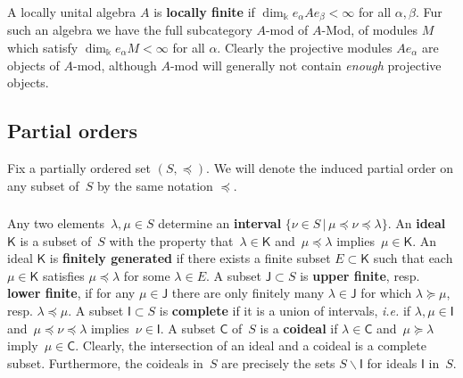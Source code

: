\documentclass[11pt]{amsart}
\newcommand{\CCC}{\mathsf{C}}
\newcommand{\III}{\mathsf{I}}
\newcommand{\JJJ}{\mathsf{J}}
\newcommand{\KKK}{\mathsf{K}}
\newcommand{\mk}{\Bbbk}
\numberwithin{equation}{section}
\theoremstyle{plain}
\theoremstyle{remark}
\theoremstyle{remark}
\theoremstyle{construction}
\begin{document}
\subsubsection{} A locally unital algebra $A$ is {\bf locally finite} if {$\dim_{\mk}e_\alpha Ae_\beta<\infty$ for all $\alpha,\beta$}. Fur such an algebra we have the full subcategory $A$-mod of $A$-Mod, of modules $M$ which satisfy $\dim_{\mk}e_\alpha M<\infty$ for all $\alpha$. Clearly the projective modules $Ae_\alpha$ are {objects of} $A$-mod, although $A$-mod will generally not contain {\em enough} projective objects.



\subsection{Partial orders} Fix a partially ordered set $(S,\preceq)$. We will denote the induced partial order on any subset of~$S$ by the same notation $\preceq$.


\subsubsection{}\label{secPaOr}
Any two elements~$\lambda,\mu\in S$ determine an {\bf interval} $\{\nu\in S\,|\,\mu\preceq\nu\preceq \lambda\}$.
 An {\bf ideal} $\KKK$ is a subset of~$S$ with the property that~$\lambda\in \KKK$ and~$\mu\preceq \lambda$ implies~$\mu\in\KKK$. An ideal $\KKK$ is {\bf finitely generated} if there exists a finite subset $E\subset \KKK$ such that each $\mu\in\KKK$ satisfies $\mu\preceq\lambda$ for some $\lambda\in E$. A subset $\JJJ { \subset S}$ is {\bf upper finite}, resp. {\bf lower finite}, if for any $\mu\in\JJJ$ there are only finitely many $\lambda\in \JJJ$ for which $\lambda\succeq\mu$, resp. $\lambda\preceq\mu$. A subset $\III{\subset S}$ is  {\bf complete} if it is a union of intervals, {\it i.e.} if $\lambda,\mu\in \III$ and~$\mu\preceq\nu\preceq \lambda$ implies~$\nu\in\III$. A subset $\CCC$ of~$S$ is a {\bf coideal} if $\lambda\in \CCC$ and~$\mu\succeq \lambda$ imply~$\mu\in\CCC$. Clearly, the intersection of an ideal and a coideal is a complete subset. Furthermore, the coideals in~$S$ are precisely the sets $S\backslash\III$ for ideals $\III$ in~$S$.
\end{document}
